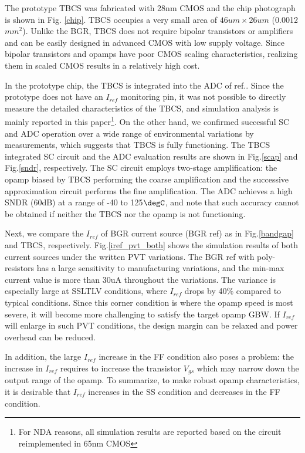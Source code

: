 \documentclass[letterpaper, 10 pt, conference]{ieeeconf}  %
\begin{document}
The prototype TBCS was fabricated with 28nm CMOS and the chip photograph is shown in Fig. \ref{chip}. TBCS occupies a very small area of $46um \times 26um$ (0.0012$mm^2$). Unlike the BGR, TBCS does not require bipolar transistors or amplifiers and can be easily designed in advanced CMOS with low supply voltage. Since bipolar transistors and opamps have poor CMOS scaling characteristics, realizing them in scaled CMOS results in a relatively high cost.

In the prototype chip, the TBCS is integrated into the ADC of ref.\cite{yoshioka201728}. Since the prototype does not have an $I_{ref}$ monitoring pin, it was not possible to directly measure the detailed characteristics of the TBCS, and simulation analysis is mainly reported in this paper\footnote{For NDA reasons, all simulation results are reported based on the circuit reimplemented in 65nm CMOS}. On the other hand, we confirmed successful SC and ADC operation over a wide range of environmental variations by measurements, which suggests that TBCS is fully functioning. The TBCS integrated SC circuit and the ADC evaluation results are shown in Fig.\ref{scap} and Fig.\ref{sndr}, respectively. The SC circuit employs two-stage amplification: the opamp biased by TBCS performing the coarse amplification and the successive approximation circuit performs the fine amplification. The ADC achieves a high SNDR (60dB) at a range of -40 to 125$\degC$, and note that such accuracy cannot be obtained if neither the TBCS nor the opamp is not functioning. 

Next, we compare the $I_{ref}$ of BGR current source (BGR ref) as in Fig.\ref{bandgap} and TBCS, respectively. Fig.\ref{iref_pvt_both} shows the simulation results of both current sources under the written PVT variations. The BGR ref with poly-resistors has a large sensitivity to manufacturing variations, and the min-max current value is more than 30uA throughout the variations. The variance is especially large at SSLTLV conditions, where $I_{ref}$ drops by 40\% compared to typical conditions.
Since this corner condition is where the opamp speed is most severe, it will become more challenging to satisfy the target opamp GBW. If $I_{ref}$ will enlarge in such PVT conditions, the design margin can be relaxed and power overhead can be reduced.

In addition, the large $I_{ref}$ increase in the FF condition also poses a problem: the increase in $I_{ref}$ requires to increase the transistor $V_{gs}$ which may narrow down the output range of the opamp. To summarize, to make robust opamp characteristics, it is desirable that $I_{ref}$ increases in the SS condition and decreases in the FF condition.
\end{document}

